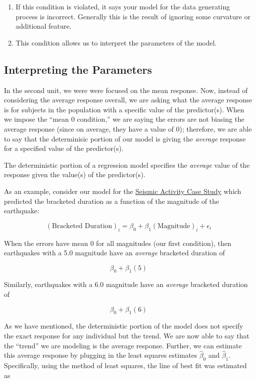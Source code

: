 \documentclass[]{book}
\providecommand{\tightlist}{%
  \setlength{\itemsep}{0pt}\setlength{\parskip}{0pt}}
\theoremstyle{plain}
\theoremstyle{mydefn}
\theoremstyle{myexmpl}
\theoremstyle{remark}
\let\BeginKnitrBlock\begin \let\EndKnitrBlock\end
\let\BeginKnitrBlock\begin \let\EndKnitrBlock\end
\begin{document}
\begin{enumerate}
\def\labelenumi{\arabic{enumi}.}
\tightlist
\item
  If this condition is violated, it says your model for the data
  generating process is incorrect. Generally this is the result of
  ignoring some curvature or additional feature.
\item
  This condition allows us to interpret the parameters of the model.
\end{enumerate}

\subsection{Interpreting the
Parameters}\label{interpreting-the-parameters}

In the second unit, we were were focused on the mean response. Now,
instead of considering the average response overall, we are asking what
the average response is for subjects in the population with a specific
value of the predictor(s). When we impose the ``mean 0 condition,'' we
are saying the errors are not biasing the average response (since on
average, they have a value of 0); therefore, we are able to say that the
determinisic portion of our model is giving the \emph{average} response
for a specified value of the predictor(s).

\BeginKnitrBlock{rmdkeyidea}
The deterministic portion of a regression model specifies the
\emph{average} value of the response given the value(s) of the
predictor(s).
\EndKnitrBlock{rmdkeyidea}

As an example, consider our model for the
\protect\hyperlink{CaseGreece}{Seismic Activity Case Study} which
predicted the bracketed duration as a function of the magnitude of the
earthquake:

\[(\text{Bracketed Duration})_i = \beta_0 + \beta_1(\text{Magnitude})_i + \epsilon_i\]

When the errors have mean 0 for all magnitudes (our first condition),
then earthquakes with a 5.0 magnitude have an \emph{average} bracketed
duration of

\[\beta_0 + \beta_1(5)\]

Similarly, earthquakes with a 6.0 magnitude have an \emph{average}
bracketed duration of

\[\beta_0 + \beta_1(6)\]

As we have mentioned, the deterministic portion of the model does not
specify the exact response for any individual but the trend. We are now
able to say that the ``trend'' we are modeling is the average response.
Further, we can estimate this average response by plugging in the least
squares estimates \(\widehat{\beta}_0\) and \(\widehat{\beta}_1\).
Specifically, using the method of least squares, the line of best fit
was estimated as
\end{document}
